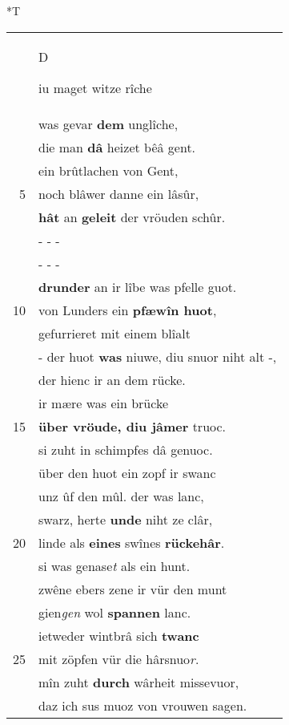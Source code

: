\documentclass[8pt,a4paper,notitlepage]{article}
\begin{document}
\begin{table}[ht]
\begin{minipage}[t]{0.5\linewidth}
\end{minipage}
\hspace{0.5cm}
\begin{minipage}[t]{0.5\linewidth}
\small
\begin{center}*T
\end{center}
\begin{tabular}{rl}
 & \begin{large}D\end{large}iu maget witze rîche\\ 
 & was gevar \textbf{dem} unglîche,\\ 
 & die man \textbf{dâ} heizet bêâ gent.\\ 
 & ein brûtlachen von Gent,\\ 
5 & noch blâwer danne ein lâsûr,\\ 
 & \textbf{hât} an \textbf{geleit} der vröuden schûr.\\ 
 & \multicolumn{1}{l}{ - - - }\\ 
 & \multicolumn{1}{l}{ - - - }\\ 
 & \textbf{drunder} an ir lîbe was pfelle guot.\\ 
10 & von Lunders ein \textbf{pfæwîn huot},\\ 
 & gefurrieret mit einem blîalt\\ 
 & - der huot \textbf{was} niuwe, diu snuor niht alt -,\\ 
 & der hienc ir an dem rücke.\\ 
 & ir mære was ein brücke\\ 
15 & \textbf{über vröude, diu jâmer} truoc.\\ 
 & si zuht in schimpfes dâ genuoc.\\ 
 & über den huot ein zopf ir swanc\\ 
 & unz ûf den mûl. der was lanc,\\ 
 & swarz, herte \textbf{unde} niht ze clâr,\\ 
20 & linde als \textbf{eines} swînes \textbf{rückehâr}.\\ 
 & si was genase\textit{t} als ein hunt.\\ 
 & zwêne ebers zene ir vür den munt\\ 
 & gien\textit{gen} wol \textbf{spannen} lanc.\\ 
 & ietweder wintbrâ sich \textbf{twanc}\\ 
25 & mit zöpfen vür die hârsnuo\textit{r}.\\ 
 & mîn zuht \textbf{durch} wârheit missevuor,\\ 
 & daz ich sus muoz von vrouwen sagen.\\ 

\end{tabular}
\end{minipage}
\end{table}
\end{document}
